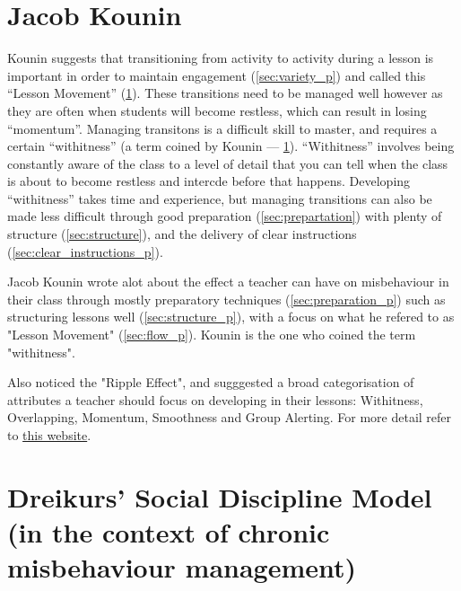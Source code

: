 \documentclass[12pt]{report}
\begin{document}
\section{Jacob Kounin}
\label{sec:kounin_theory}

Kounin suggests that transitioning from activity to activity during a lesson is important in order to maintain engagement (\ref{sec:variety_p}) and called this ``Lesson Movement'' (\ref{sec:kounin_theory}). These transitions need to be managed well however as they are often when students will become restless, which can result in losing ``momentum''. Managing transitons is a difficult skill to master, and requires a certain ``withitness'' (a term coined by Kounin  --- \ref{sec:kounin_theory}). ``Withitness'' involves being constantly aware of the class to a level of detail that you can tell when the class is about to become restless and intercde before that happens. Developing ``withitness'' takes time and experience, but managing transitions can also be made less difficult through good preparation (\ref{sec:prepartation}) with plenty of structure (\ref{sec:structure}), and the delivery of clear instructions (\ref{sec:clear_instructions_p}).

Jacob Kounin wrote alot about the effect a teacher can have on misbehaviour in their class through mostly preparatory techniques (\ref{sec:preparation_p}) such as structuring lessons well (\ref{sec:structure_p}), with a focus on what he refered to as "Lesson Movement" (\ref{sec:flow_p}). Kounin is the one who coined the term "withitness".

Also noticed the "Ripple Effect", and sugggested a broad categorisation of attributes a teacher should focus on developing in their lessons: Withitness, Overlapping, Momentum, Smoothness and Group Alerting. For more detail refer to \href{http://universityofhullscitts.org.uk/scitts/site/pt/behaviour/kounin.html}{this website}.

\section{Dreikurs' Social Discipline Model (in the context of chronic misbehaviour management)}
\label{sec:dreikur_theory}
\end{document}
